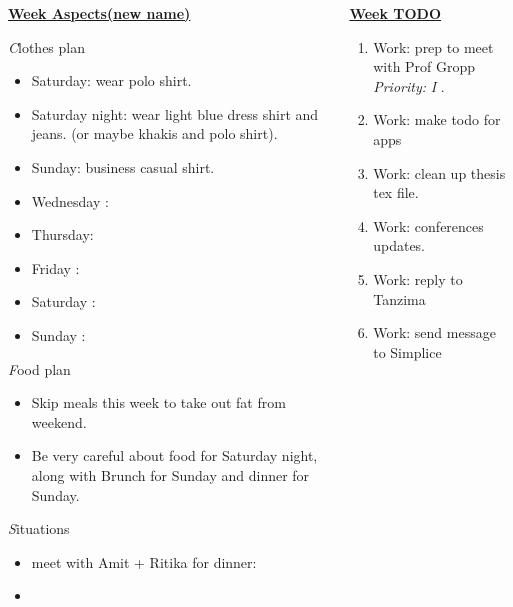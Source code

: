 \documentclass[serif,mathserif,final]{beamer}
\newcommand{\priority}[1]{\textit{Priority:} \textit{#1}}
\begin{document}
\begin{frame}{}
\begin{columns}[t]
\begin{column}{0.30\linewidth} {\textbf{\underline{Week Aspects(new name)}}}
  \begin{block}{\textit Clothes plan } 
    \begin{itemize} 
    \tiny \item \tiny Saturday: wear polo shirt. 
    \item \tiny Saturday night: wear light blue dress shirt and jeans. (or maybe khakis and polo shirt). 
    \item \tiny Sunday: business casual shirt. 
    \item \tiny Wednesday : 
    \item \tiny Thursday: 
    \item \tiny Friday : 
    \item \tiny Saturday : 
    \item \tiny Sunday : 
    \end{itemize} 
  \end{block} 

  \begin{block}{\textit Food plan } 
    \begin{itemize} 
      \small \item \tiny Skip meals this week to take out fat from weekend. 
    \item \tiny Be very careful about food for Saturday night, along with Brunch for Sunday and dinner for Sunday. 
    \end{itemize} 
  \end{block} 

  \begin{block}{\textit Situations} 
    \begin{itemize} 
    \item \tiny meet with Amit + Ritika for dinner:       
    \item \tiny 
    \end{itemize}
  \end{block} 
\end{column} %

\begin{column}{0.33\linewidth}{\textbf{\underline{Week TODO}}} 

\begin{block}

\begin{enumerate} 
\item \tiny Work: prep to meet with Prof Gropp  \priority{I} . 
\item \tiny Work: make todo for apps 
\item \tiny Work: clean up thesis tex file. 
\item \tiny Work: conferences updates.
\item \tiny Work: reply to Tanzima 
\item \tiny Work: send message to Simplice 


\end{enumerate}
\end{block}
\end{column}
\end{columns}
\end{frame}
\end{document}
